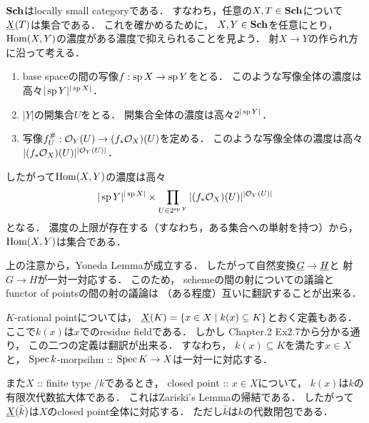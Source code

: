 \documentclass[a4paper]{jsarticle}
\begin{document}
    \begin{Remark}
        $\mathbf{Sch}$はlocally small categoryである．
        すなわち，任意の$X, T \in \mathbf{Sch}$について$\underline{X}(T)$は集合である．
        これを確かめるために，
        $X, Y \in \mathbf{Sch}$を任意にとり，
        $\operatorname{Hom}(X,Y)$の濃度がある濃度で抑えられることを見よう．
        射$X \to Y$の作られ方に沿って考える．
        \begin{enumerate}[label=(\arabic*), leftmargin=*]
        \item
            base spaceの間の写像$f: \operatorname{sp} X \to \operatorname{sp} Y$をとる．
            このような写像全体の濃度は高々$|\operatorname{sp} Y|^{|\operatorname{sp} X|}$．
        \item
            $|Y|$の開集合$U$をとる．
            開集合全体の濃度は高々$2^{|\operatorname{sp} Y|}$．
        \item
            写像$f^{\#}_U: \mathcal{O}_Y(U) \to (f_* \mathcal{O}_X)(U)$を定める．
            このような写像全体の濃度は高々$|(f_* \mathcal{O}_X)(U)|^{|\mathcal{O}_Y(U)|}$．
        \end{enumerate}
        したがって$\operatorname{Hom}(X,Y)$の濃度は高々
        \[|\operatorname{sp} Y|^{|\operatorname{sp} X|} \times \prod_{U \in 2^{\operatorname{sp} Y}} |(f_* \mathcal{O}_X)(U)|^{|\mathcal{O}_Y(U)|} \]
        となる．
        濃度の上限が存在する（すなわち，ある集合への単射を持つ）から，
        $\operatorname{Hom}(X,Y)$は集合である．
    \end{Remark}

    \begin{Remark}
        上の注意から，Yoneda Lemmaが成立する．
        したがって自然変換$\underline{G} \to \underline{H}$と
        射$G \to H$が一対一対応する．
        このため，
        schemeの間の射についての議論と
        functor of pointsの間の射の議論は
        （ある程度）互いに翻訳することが出来る．
    \end{Remark}

    \begin{Remark}\label{remark:closedpoint}
        $K$-rational pointについては，
        $\underline{X}(K)=\{ x \in X \mid k(x) \subseteq K \}$とおく定義もある．
        ここで$k(x)$は$x$でのresidue fieldである．
        しかし\cite{HarAG} Chapter.2 Ex2.7から分かる通り，
        この二つの定義は翻訳が出来る．
        すなわち，
        $k(x) \subseteq K$を満たす$x \in X$と，
        $\operatorname{Spec} k$-morpsihm :: $\operatorname{Spec} K \to X$は一対一に対応する．

        また$X$ :: finite type /$k$であるとき，
        closed point :: $x \in X$について，
        $k(x)$は$k$の有限次代数拡大体である．
        これはZariski's Lemmaの帰結である．
        したがって$\underline{X}(\bar{k})$は$X$のclosed point全体に対応する．
        ただし$\bar{k}$は$k$の代数閉包である．
    \end{Remark}
\end{document}
